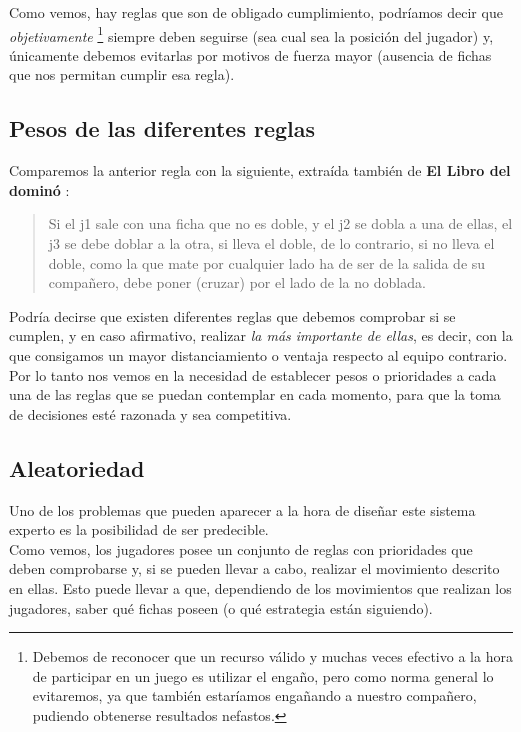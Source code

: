 Como vemos, hay reglas que son de obligado cumplimiento, podríamos decir que \emph{objetivamente} \footnote{Debemos de
reconocer que un recurso válido y muchas veces efectivo a la hora de participar en un juego es utilizar el engaño, pero
como norma general lo evitaremos, ya que también estaríamos engañando a nuestro compañero, pudiendo obtenerse resultados
nefastos.} siempre deben seguirse (sea cual sea la posición del jugador) y, únicamente debemos evitarlas por motivos de
fuerza mayor (ausencia de fichas que nos permitan cumplir esa regla).

\subsection{Pesos de las diferentes reglas}

Comparemos la anterior regla con la siguiente, extraída también de \textbf{El Libro del dominó} \cite{mora90}:

\begin{quote}
    Si el j1 sale con una ficha que no es doble, y el j2 se dobla a una de ellas, el j3 se debe doblar a la otra, si
    lleva el doble, de lo contrario, si no lleva el doble, como la que mate por cualquier lado ha de ser de la
    salida de su compañero, debe poner (cruzar) por el lado de la no doblada.
\end{quote}

Podría decirse que existen diferentes reglas que debemos comprobar si se cumplen, y en caso afirmativo, realizar \emph{la
más importante de ellas}, es decir, con la que consigamos un mayor distanciamiento o ventaja respecto al equipo contrario. \\

Por lo tanto nos vemos en la necesidad de establecer pesos o prioridades a cada una de las reglas que se puedan contemplar
en cada momento, para que la toma de decisiones esté razonada y sea competitiva.

\subsection{Aleatoriedad}

Uno de los problemas que pueden aparecer a la hora de diseñar este sistema experto es la posibilidad de ser predecible. \\

Como vemos, los jugadores posee un conjunto de reglas con prioridades que deben comprobarse y, si se pueden llevar a cabo,
realizar el movimiento descrito en ellas. Esto puede llevar a que, dependiendo de los movimientos que realizan los jugadores,
saber qué fichas poseen (o qué estrategia están siguiendo). \\

